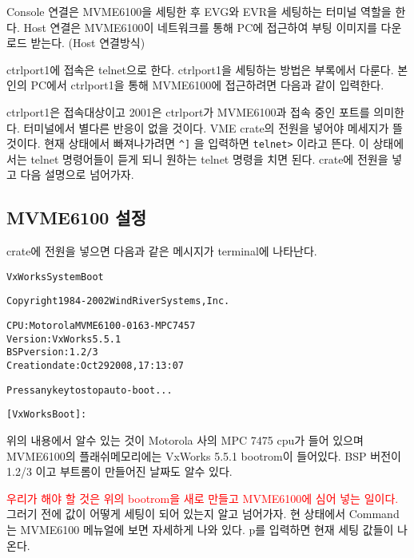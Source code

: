 \documentclass[11pt,a4paper]{article}
\begin{document}
Console 연결은 MVME6100을 세팅한 후 EVG와 EVR을 세팅하는 터미널 역할을 한다.
Host 연결은 MVME6100이 네트워크를 통해 PC에 접근하여 부팅 이미지를 다운로드 받는다. (Host 연결방식)

ctrlport1에 접속은 telnet으로 한다. ctrlport1을 세팅하는 방법은 부록에서 다룬다.
본인의 PC에서 ctrlport1을 통해 MVME6100에 접근하려면 다음과 같이 입력한다.

\begin{framed}
\begin{alltt}
ctrluser@ctrlport0:~$ telnet ctrlport1 2001
Trying 10.1.5.161...
Connected to ctrlport1.risp.net.
Escape character is '^]'.
\end{alltt}
\end{framed}

ctrlport1은 접속대상이고 2001은 ctrlport가 MVME6100과 접속 중인 포트를 의미한다.
터미널에서 별다른 반응이 없을 것이다. VME crate의 전원을 넣어야 메세지가 뜰 것이다.
현재 상태에서 빠져나가려면 \verb|^]| 을 입력하면 \verb|telnet>| 이라고 뜬다. 이 상태에서는 
telnet 명령어들이 듣게 되니 원하는 telnet 명령을 치면 된다.
crate에 전원을 넣고 다음 설명으로 넘어가자.
 
\subsection{MVME6100 설정}
crate에 전원을 넣으면 다음과 같은 메시지가 terminal에 나타난다.
\begin{framed}
\begin{alltt}
                            VxWorks System Boot


Copyright 1984-2002  Wind River Systems, Inc.



CPU: Motorola MVME6100-0163 - MPC 7457
Version: VxWorks5.5.1
BSP version: 1.2/3
Creation date: Oct 29 2008, 17:13:07


Press any key to stop auto-boot...

[VxWorks Boot]:

\end{alltt}
\end{framed}
위의 내용에서 알수 있는 것이 Motorola 사의 MPC 7475 cpu가 들어 있으며
MVME6100의 플래쉬메모리에는 VxWorks 5.5.1 bootrom이 들어있다.
BSP 버전이 1.2/3 이고 부트롬이 만들어진 날짜도 알수 있다.

\textcolor{red}{우리가 해야 할 것은 위의 bootrom을 새로 만들고 MVME6100에 심어 넣는 일이다.}
그러기 전에 값이 어떻게 세팅이 되어 있는지 알고 넘어가자. 현 상태에서 Command 는 
MVME6100 메뉴얼에 보면 자세하게 나와 있다. p를 입력하면 현재 세팅 값들이 나온다.
\end{document}
